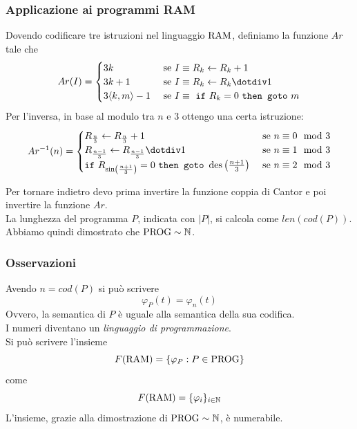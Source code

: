 \subsubsection{Applicazione ai programmi RAM}
Dovendo codificare tre istruzioni nel linguaggio $\text{RAM}$, definiamo la funzione $Ar$ tale che
$$ 
Ar(I) = \begin{cases}
	3k & \text{ se } I \equiv R_k \leftarrow R_k + 1 \\
	3k + 1 & \text{ se } I \equiv R_k \leftarrow R_k \dotminus 1 \\
	3 \langle k,m\rangle - 1 & \text{ se } I \equiv \text{ \texttt{if} } R_k = 0 \text{ \texttt{then goto} } m \\
\end{cases}
$$
Per l'inversa, in base al modulo tra $n$ e 3 ottengo una certa istruzione: 
$$
Ar^{-1} (n) = \begin{cases}
	R_{\frac{n}{3}} \leftarrow R_{\frac{n}{3}} + 1 & \text{ se } n \equiv 0 \mod 3 \\
	R_{\frac{n-1}{3}} \leftarrow R_{\frac{n-1}{3}} \dotminus 1 & \text{ se } n \equiv 1 \mod 3 \\
	\text{\texttt{if} } R_{\sin\left(\frac{n+1}{3}\right)} = 0 \text{ \texttt{then goto} } \des\left(\frac{n+1}{3}\right) & \text{ se } n \equiv 2 \mod 3 \\
\end{cases}
$$

Per tornare indietro devo prima invertire la funzione coppia di Cantor e poi invertire la funzione $Ar$.\\
La lunghezza del programma $P$, indicata con $|P|$, si calcola come $len(cod(P))$.\\

Abbiamo quindi dimostrato che $\text{PROG} \sim \mathbb{N}$.\\

\subsubsection{Osservazioni}
Avendo $n = cod(P)$ si può scrivere
$$ \varphi_P (t) = \varphi_n (t) $$
Ovvero, la semantica di $P$ è uguale alla semantica della sua codifica. \\

I numeri diventano un \textit{linguaggio di programmazione}.\\

Si può scrivere l'insieme 
$$ F(\text{RAM}) = \{\varphi_P: P \in \text{PROG} \}$$
come 
$$ F(\text{RAM}) = \{\varphi_i\}_{i \in \mathbb{N}} $$
L'insieme, grazie alla dimostrazione di $\text{PROG} \sim \mathbb{N}$, è numerabile.\\

